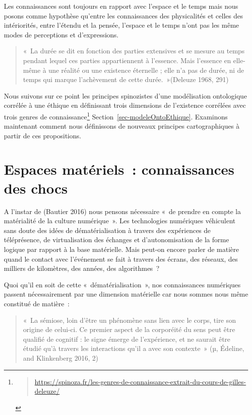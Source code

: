 \documentclass[
  letterpaper,
  DIV=11,
  numbers=noendperiod]{scrreprt}
\begin{document}
Les connaissances sont toujours en rapport avec l'espace et le temps
mais nous posons comme hypothèse qu'entre les connaissances des
physicalités et celles des intériorités, entre l'étendu et la pensée,
l'espace et le temps n'ont pas les même modes de perceptions et
d'expressions.

\begin{quote}
«~La durée se dit en fonction des parties extensives et se mesure au
temps pendant lequel ces parties appartiennent à l'essence. Mais
l'essence en elle-même à une réalité ou une existence éternelle ; elle
n'a pas de durée, ni de temps qui marque l'achèvement de cette
durée.~»(Deleuze 1968, 291)
\end{quote}

Nous suivons sur ce point les principes spinozistes d'une modélisation
ontologique corrélée à une éthique en définissant trois dimensions de
l'existence corrélées avec trois genres de connaissance\footnote{\begin{quote}
  \url{https://spinoza.fr/les-genres-de-connaissance-extrait-du-cours-de-gilles-deleuze/}
  \end{quote}} Section~\ref{sec-modeleOntoEthique}. Examinons maintenant
comment nous définissons de nouveaux principes cartographiques à partir
de ces propositions.

\hypertarget{sec-espaceMateriels}{%
\section{Espaces matériels~: connaissances des
chocs}\label{sec-espaceMateriels}}

A l'instar de (Bautier 2016) nous pensons nécessaire «~de prendre en
compte la matérialité de la culture numérique~». Les technologies
numériques véhiculent sans doute des idées de dématérialisation à
travers des expériences de téléprésence, de virtualisation des échanges
et d'autonomisation de la forme logique par rapport à la base
matérielle. Mais peut-on encore parler de matière quand le contact avec
l'événement se fait à travers des écrans, des réseaux, des milliers de
kilomètres, des années, des algorithmes~?

Quoi qu'il en soit de cette «~dématérialisation~», nos connaissances
numériques passent nécessairement par une dimension matérielle car nous
sommes nous même constitué de matière~:

\begin{quote}
«~La sémiose, loin d'être un phénomène sans lien avec le corps, tire son
origine de celui-ci. Ce premier aspect de la corporéité du sens peut
être qualifié de cognitif : le signe émerge de l'expérience, et ne
saurait être étudié qu'à travers les interactions qu'il a avec son
contexte~» (µ, Édeline, and Klinkenberg 2016, 2)
\end{quote}
\end{document}
